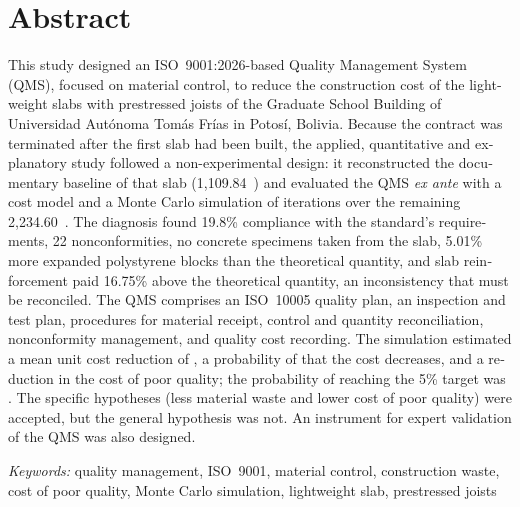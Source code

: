 \chapter*{Abstract}
\begin{otherlanguage}{english}
\noindent This study designed an ISO~9001:2026-based Quality Management System (QMS), focused on material control, to reduce the construction cost of the lightweight slabs with prestressed joists of the Graduate School Building of Universidad Autónoma Tomás Frías in Potosí, Bolivia. Because the contract was terminated after the first slab had been built, the applied, quantitative and explanatory study followed a non-experimental design: it reconstructed the documentary baseline of that slab (1,109.84~\mdos{}) and evaluated the QMS \emph{ex ante} with a cost model and a Monte Carlo simulation of \MCiterEN{} iterations over the remaining 2,234.60~\mdos{}. The diagnosis found 19.8\% compliance with the standard's requirements, 22 nonconformities, no concrete specimens taken from the slab, 5.01\% more expanded polystyrene blocks than the theoretical quantity, and slab reinforcement paid 16.75\% above the theoretical quantity, an inconsistency that must be reconciled. The QMS comprises an ISO~10005 quality plan, an inspection and test plan, procedures for material receipt, control and quantity reconciliation, nonconformity management, and quality cost recording. The simulation estimated a mean unit cost reduction of \rMediaEN{}, a probability of \PRposEN{} that the cost decreases, and a \CNCreduccionPctEN{} reduction in the cost of poor quality; the probability of reaching the 5\% target was \PHGEN{}. The specific hypotheses (less material waste and lower cost of poor quality) were accepted, but the general hypothesis was not. An instrument for expert validation of the QMS was also designed.

\emph{Keywords:} quality management, ISO~9001, material control, construction waste, cost of poor quality, Monte Carlo simulation, lightweight slab, prestressed joists
\end{otherlanguage}
